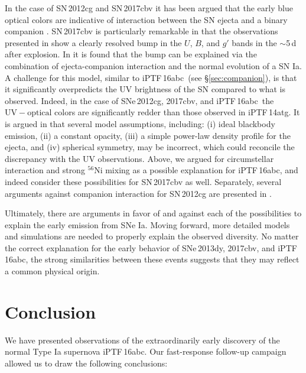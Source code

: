 \documentclass[twocolumn]{aastex61}
\newcommand{\abc}{iPTF\,16abc}
\begin{document}
In the case of SN\,2012cg and SN\,2017cbv it has been argued that the early blue optical colors are indicative of interaction between the SN ejecta and a binary companion \citep{2016ApJ...820...92M,2017arXiv170608990H}. SN\,2017cbv is particularly remarkable in that the observations presented in \citet{2017arXiv170608990H} show a clearly resolved bump in the $U$, $B$, and $g'$ bands in the $\sim$5\,d after explosion. In \citeauthor{2017arXiv170608990H} it is found that the bump can be explained via the combination of ejecta-companion interaction and the normal evolution of a SN Ia. A challenge for this model, similar to \abc\ (see \S\ref{sec:companion}), is that it significantly overpredicts the UV brightness of the SN compared to what is observed. Indeed, in the case of SNe\,2012cg, 2017cbv, and \abc\ the $\mathrm{UV} - \mathrm{optical}$ colors are significantly redder than those observed in iPTF\,14atg. It is argued in \citet{2017arXiv170608990H} that several model assumptions, including: (i) ideal blackbody emission, (ii) a constant opacity, (iii) a simple power-law density profile for the ejecta, and (iv) spherical symmetry, may be incorrect, which could reconcile the discrepancy with the UV observations. Above, we argued for circumstellar interaction and strong $^{56}$Ni mixing as a possible explanation for \abc, and indeed \citet{2017arXiv170608990H} consider these possibilities for SN\,2017cbv as well. Separately, several arguments against companion interaction for SN\,2012cg are presented in \citet{2016arXiv161007601S}. 

Ultimately, there are arguments in favor of and against each of the possibilities to explain the early emission from SNe Ia. Moving forward, more detailed models and simulations are needed to properly explain the observed diversity. No matter the correct explanation for the early behavior of SNe\,2013dy, 2017cbv, and \abc, the strong similarities between these events suggests that they may reflect a common physical origin. 

\section{Conclusion}
\label{sec:conclusion}

We have presented observations of the extraordinarily early discovery of the 
normal Type Ia supernova \abc. Our fast-response follow-up 
campaign allowed us to draw the following conclusions:
\end{document}
